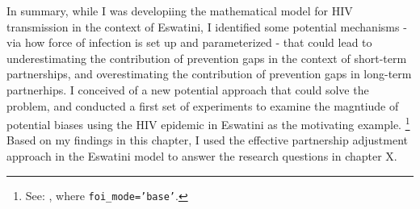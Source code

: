 In summary, while I was developiing the mathematical model for HIV transmission in the context of Eswatini, 
I identified some potential mechanisms - via how force of infection is set up and parameterized -  
that could lead to underestimating the contribution of prevention gaps in the context of short-term 
partnerships, and overestimating the contribution of prevention gaps in long-term partnerhips. 
I conceived of a new potential approach that could solve the problem, and conducted a first set of experiments
to examine the magntiude of potential biases using the HIV epidemic in Eswatini as the motivating example. 
\footnote{See: ,
  where \texttt{foi_mode='base'}.}
Based on my findings in this chapter, I used the effective partnership adjustment approach in the Eswatini 
model to answer the research questions in chapter X. 

